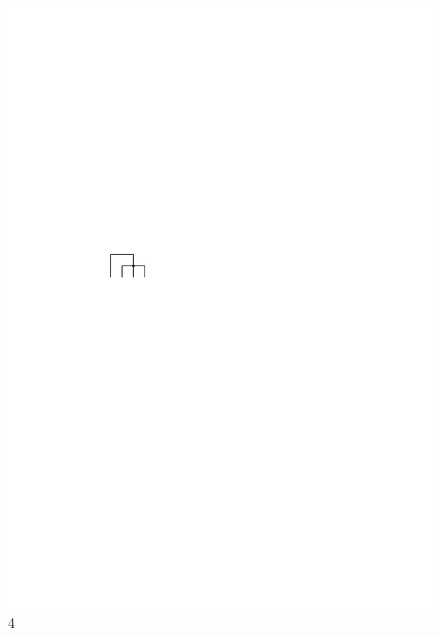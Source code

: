 \documentclass{beamer}
\begin{document}
\begin{frame}
\begin{columns}[b]
\begin{column}{2cm}
\begin{figure}[h]
                \includegraphics[scale=.8]{oc3_embed/incoming/indeg4}
                \caption{4}
        \end{figure}
\end{column}
\end{columns}
\end{frame}
\end{document}
